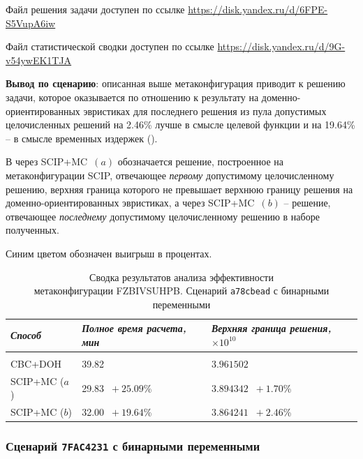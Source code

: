 \documentclass[%
	11pt,
	a4paper,
	utf8,
		]{article}
\begin{document}
Файл решения задачи доступен по ссылке \url{https://disk.yandex.ru/d/6FPE-S5VupA6iw}

Файл статистической сводки доступен по ссылке \url{https://disk.yandex.ru/d/9G-v54ywEK1TJA}

\vspace*{3mm}
\textbf{Вывод по сценарию}: описанная выше метаконфигурация приводит к решению задачи, которое оказывается по отношению к результату на доменно-ориентированных эвристиках для последнего решения из пула допустимых целочисленных решений на 2.46\% лучше в смысле целевой функции и на 19.64\% -- в смысле временных издержек ().

В   через SCIP+MC~$ (a) $ обозначается решение, построенное на метаконфигурации SCIP, отвечающее \emph{первому} допустимому целочисленному решению, верхняя граница которого не превышает верхнюю границу решения на доменно-ориентированных эвристиках, а через SCIP+MC~$ (b) $ -- решение, отвечающее \emph{последнему} допустимому целочисленному решению в наборе полученных.

Синим цветом обозначен выигрыш в процентах.

{
\begin{table}[!h]
	\centering
	\caption{Сводка результатов анализа эффективности\\метаконфигурации FZBIVSUHPB. Сценарий \texttt{a78cbead} с бинарными переменными}
	\begin{tabular}{ p{2.5cm} p{3.3cm} p{3.4cm} }
		\emph{Способ} & \emph{Полное время расчета, мин} & \emph{Верхняя граница решения, $ \times 10^{10} $} \\
		\hline\hline\\[-3.5mm]
		{CBC+DOH} & 39.82 & $ 3.961502 $ \\
		\hline
		SCIP+MC ($ a $) & 29.83 {\color{blue} $\ +25.09 $\%} & $ 3.894342 $ {\color{blue} $\ +1.70 $\%} \\
		\hline
		SCIP+MC ($ b $) & 32.00 {\color{blue} $\ +19.64 $\%} & $ 3.864241 $ {\color{blue} $\ +2.46 $\%} \\
	\end{tabular}\label{tab:a78cbead}
\end{table}
}

\subsubsection{Сценарий \texttt{7FAC4231} с бинарными переменными}
\end{document}
